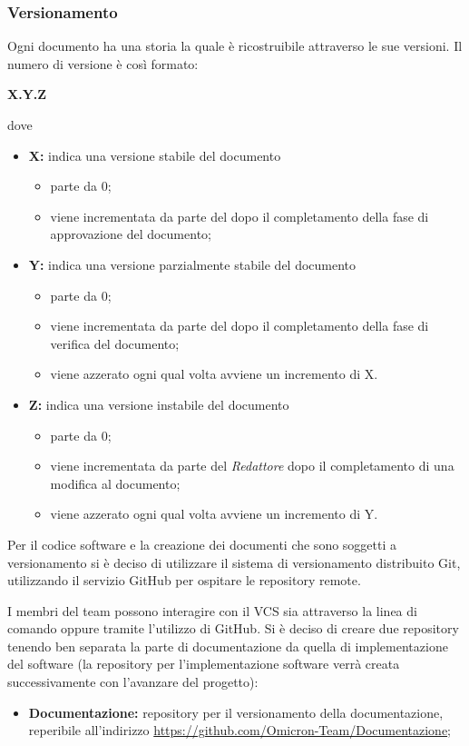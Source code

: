 \subsubsection{Versionamento}
Ogni documento ha una storia la quale è ricostruibile attraverso le sue versioni. Il numero di versione è così formato:
\begin{center}
\textbf{X.Y.Z}
\end{center}
dove
\begin{itemize}
 \item \textbf{X:} indica una versione stabile del documento
 	\begin{itemize}
 		\item parte da 0;
 		\item viene incrementata da parte del \respProg{} dopo il completamento della fase di approvazione del documento;
 	\end{itemize}
 \item \textbf{Y:}  indica una versione parzialmente stabile del documento
 	\begin{itemize}
 		\item parte da 0;
 		\item viene incrementata da parte del \verifProg{} dopo il completamento della fase di verifica del documento;
 		\item viene azzerato ogni qual volta avviene un incremento di X.
 	\end{itemize}
 \item \textbf{Z:} indica una versione instabile del documento
 \begin{itemize}
 		\item parte da 0;
 		\item viene incrementata da parte del \emph{Redattore} dopo il completamento di una modifica al documento;
 		\item viene azzerato ogni qual volta avviene un incremento di Y.
 	\end{itemize}
\end{itemize}

Per il codice software e la creazione dei documenti che sono soggetti a versionamento si è deciso di utilizzare il sistema di versionamento distribuito Git, utilizzando il servizio GitHub per ospitare le repository remote.


I membri del team \Omicron{} possono interagire con il VCS sia attraverso la linea di comando oppure tramite l'utilizzo di GitHub. Si è deciso di creare due repository tenendo ben separata la parte di documentazione da quella di implementazione del software (la repository per l'implementazione software verrà creata successivamente con l'avanzare del progetto):
\begin{itemize}
 \item \textbf{Documentazione:} repository per il versionamento della documentazione, reperibile all'indirizzo \url{https://github.com/Omicron-Team/Documentazione};
\end{itemize}

